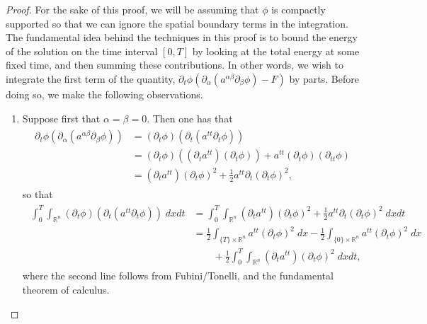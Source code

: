 \documentclass{article}
\numberwithin{equation}{section}
\begin{document}
	\begin{proof}
		For the sake of this proof, we will be assuming that $\phi$ is compactly supported so that we can ignore the spatial boundary terms in the integration. The fundamental idea behind the techniques in this proof is to bound the energy of the solution on the time interval $[0,T]$ by looking at the total energy at some fixed time, and then summing these contributions. In other words, we wish to integrate the first term of the quantity, $\partial_{t}\phi(\partial_{\alpha}(a^{\alpha\beta}\partial_{\beta}\phi) - F)$ by parts. Before doing so, we make the following observations. 
		\begin{enumerate}[itemsep =-2pt,label = (\arabic{*})]
			\item Suppose first that $\alpha = \beta = 0$. Then one has that 
			\begin{align*}
				\begin{split}
					\partial_{t}\phi(\partial_{\alpha}(a^{\alpha\beta}\partial_{\beta}\phi)) &= (\partial_{t}\phi)(\partial_{t}(a^{tt}\partial_{t}\phi)) \\
					&= (\partial_{t}\phi)((\partial_{t}a^{tt})(\partial_{t}\phi)) + a^{tt}(\partial_{t}\phi)(\partial_{tt}\phi) \\
					&= (\partial_{t}a^{tt})(\partial_{t}\phi)^{2} + \frac{1}{2}a^{tt}\partial_{t}(\partial_{t}\phi)^{2}, 
				\end{split}
			\end{align*}
			so that 
			\begin{align*}
				\begin{split}
					\int_{0}^{T}\int_{\mathbb{R}^{n}}(\partial_{t}\phi)(\partial_{t}(a^{tt}\partial_{t}\phi))\;dxdt &= \int_{0}^{T}\int_{\mathbb{R}^{n}} (\partial_{t}a^{tt})(\partial_{t}\phi)^{2} + \frac{1}{2}a^{tt}\partial_{t}(\partial_{t}\phi)^{2}\;dx dt \\
					&= \frac{1}{2}\int_{\{T\} \times \mathbb{R}^{n}}a^{tt}(\partial_{t}\phi)^{2}\;dx - \frac{1}{2}\int_{\{0\} \times \mathbb{R}^{n}}a^{tt}(\partial_{t}\phi)^{2}\;dx \\
					&\qquad + \frac{1}{2}\int_{0}^{T}\int_{\mathbb{R}^{n}}(\partial_{t}a^{tt})(\partial_{t}\phi)^{2}\;dxdt, 
				\end{split}
			\end{align*}
			where the second line follows from Fubini/Tonelli, and the fundamental theorem of calculus. 
			

\end{enumerate}
\end{proof}
\end{document}
